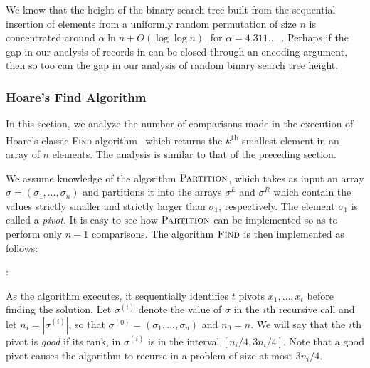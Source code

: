 \documentclass{patmorin}
\begin{document}
\begin{rem}
  We know that the height of the binary search tree built from the
  sequential insertion of elements from a uniformly random permutation
  of size $n$ is concentrated around $\alpha \ln n + O(\log \log n)$,
  for $\alpha = 4.311...$~\cite{reed:height}. Perhaps if the gap in
  our analysis of records in  can be closed through an
  encoding argument, then so too can the gap in our analysis of random
  binary search tree height.
\end{rem}

\subsubsection{Hoare's Find Algorithm}

In this section, we analyze the number of comparisons made in the
execution of Hoare's classic \textsc{Find} algorithm~\cite{hoare:find}
which returns the $k$\textsuperscript{th} smallest element in an array
of $n$ elements. The analysis is similar to that of the preceding
section.

We assume knowledge of the algorithm $\textsc{Partition}$, which takes
as input an array $\sigma = (\sigma_1, \dots, \sigma_n)$ and
partitions it into the arrays $\sigma^L$ and $\sigma^R$ which contain
the values strictly smaller and strictly larger than $\sigma_1$,
respectively. The element $\sigma_1$ is called a \emph{pivot}. It is
easy to see how $\textsc{Partition}$ can be implemented so as to
perform only $n - 1$ comparisons. The algorithm $\textsc{Find}$ is
then implemented as follows:

:
\begin{algorithmic}[1]
  \ENDIF
\end{algorithmic}

As the algorithm executes, it sequentially identifies $t$ pivots
$x_1, \dots, x_t$ before finding the solution. Let $\sigma^{(i)}$
denote the value of $\sigma$ in the $i{\text{th}}$ recursive call and let $n_i=|\sigma^{(i)}|$,
so that $\sigma^{(0)}=(\sigma_1,\ldots,\sigma_n)$ and $n_0=n$.  We will say that
the $i{\text{th}}$ pivot is \emph{good} if its rank, in $\sigma^{(i)}$
is in the interval $[n_i/4, 3n_i/4]$. Note that
a good pivot causes the algorithm to recurse in a problem of size at
most $3n_i/4$.
\end{document}
